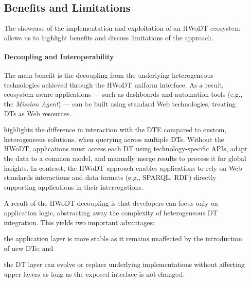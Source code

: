 

\subsection{Benefits and Limitations}
\label{ssec:benefits-limitations}


The showcase of the implementation and exploitation of an \ac{HWoDT} ecosystem allows us to highlight benefits and discuss limitations of the approach.

\paragraph{Decoupling and Interoperability}
The main benefit is the decoupling from the underlying heterogeneous technologies achieved through the \ac{HWoDT} uniform interface.
%
As a result, ecosystem-aware applications — such as dashboards and automation tools (e.g., the \emph{Mission Agent}) — can be built using standard Web technologies, treating \acp{DT} as Web resources.

 highlights the difference in interaction with the \ac{DTE} compared to custom, heterogeneous solutions, when querying across multiple \acp{DT}.
%
Without the \ac{HWoDT}, applications must access each \ac{DT} using technology-specific \acp{API}, adapt the data to a common model, and manually merge results to process it for global insights.
In contrast, the \ac{HWoDT} approach enables applications to rely on Web standards interactions and data formats (e.g., SPARQL, \ac{RDF}) directly supporting applications in their interrogations.


A result of the \ac{HWoDT} decoupling is that developers can focus only on application logic, abstracting away the complexity of heterogeneous \ac{DT} integration.  
This yields two important advantages:  
\begin{inlinelist}
    \item the application layer is more stable as it remains unaffected by the introduction of new \acp{DT};
    and  
    \item the \ac{DT} layer can evolve or replace underlying implementations without affecting upper layers as long as the exposed interface is not changed.
\end{inlinelist}

